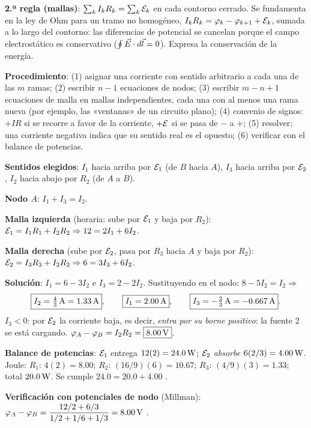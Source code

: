 \textbf{2.ª regla (mallas)}: $\sum_kI_kR_k=\sum_k\mathcal{E}_k$ en cada contorno cerrado. Se fundamenta en la ley de Ohm para un tramo no homogéneo, $I_kR_k=\varphi_k-\varphi_{k+1}+\mathcal{E}_k$, sumada a lo largo del contorno: las diferencias de potencial se cancelan porque el campo electrostático es conservativo ($\oint\vec{E}\cdot d\vec l=0$). Expresa la conservación de la energía.

\textbf{Procedimiento}: (1) asignar una corriente con sentido arbitrario a cada una de las $m$ ramas; (2) escribir $n-1$ ecuaciones de nodos; (3) escribir $m-n+1$ ecuaciones de malla en mallas independientes, cada una con al menos una rama nueva (por ejemplo, las «ventanas» de un circuito plano); (4) convenio de signos: $+IR$ si se recorre a favor de la corriente, $+\mathcal{E}$ si se pasa de $-$ a $+$; (5) resolver; una corriente negativa indica que su sentido real es el opuesto; (6) verificar con el balance de potencias.

\begin{center}\circSunoQdoce\end{center}
\textbf{Sentidos elegidos}: $I_1$ hacia arriba por $\mathcal{E}_1$ (de $B$ hacia $A$), $I_3$ hacia arriba por $\mathcal{E}_2$, $I_2$ hacia abajo por $R_2$ (de $A$ a $B$).

\textbf{Nodo $A$}: $I_1+I_3=I_2$.

\textbf{Malla izquierda} (horaria: sube por $\mathcal{E}_1$ y baja por $R_2$): $\mathcal{E}_1=I_1R_1+I_2R_2\Rightarrow12=2I_1+6I_2$.

\textbf{Malla derecha} (sube por $\mathcal{E}_2$, pasa por $R_3$ hacia $A$ y baja por $R_2$): $\mathcal{E}_2=I_3R_3+I_2R_2\Rightarrow6=3I_3+6I_2$.

\textbf{Solución}: $I_1=6-3I_2$ e $I_3=2-2I_2$. Sustituyendo en el nodo: $8-5I_2=I_2\Rightarrow$
\[
\boxed{I_2=\tfrac43\,\mathrm{A}=1.33\,\mathrm{A}},\qquad\boxed{I_1=2.00\,\mathrm{A}},\qquad\boxed{I_3=-\tfrac23\,\mathrm{A}=-0.667\,\mathrm{A}}.
\]
$I_3<0$: por $\mathcal{E}_2$ la corriente baja, es decir, \emph{entra por su borne positivo}: la fuente 2 se está cargando. $\varphi_A-\varphi_B=I_2R_2=\boxed{8.00\,\mathrm{V}}$.

\textbf{Balance de potencias}: $\mathcal{E}_1$ entrega $12(2)=24.0\,\mathrm{W}$; $\mathcal{E}_2$ \emph{absorbe} $6(2/3)=4.00\,\mathrm{W}$. Joule: $R_1$: $4(2)=8.00$; $R_2$: $(16/9)(6)=10.67$; $R_3$: $(4/9)(3)=1.33$; total $20.0\,\mathrm{W}$. Se cumple $24.0=20.0+4.00$ \checkmark.

\textbf{Verificación con potenciales de nodo} (Millman): $\varphi_A-\varphi_B=\dfrac{12/2+6/3}{1/2+1/6+1/3}=8.00\,\mathrm{V}$ \checkmark.

